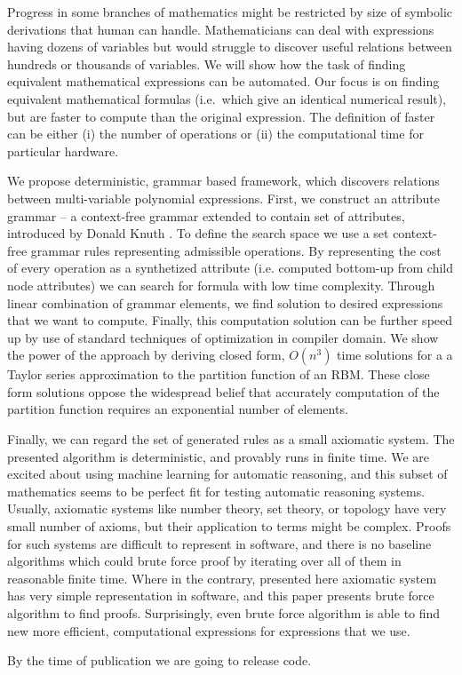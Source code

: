 Progress in some branches of
mathematics might be restricted by size of symbolic derivations that human can
handle.  Mathematicians can deal with expressions having dozens of
variables but would struggle to discover useful relations between hundreds or
thousands of variables. We will show how the task of finding equivalent
mathematical expressions can be automated. Our focus is on finding equivalent
mathematical formulas (i.e.~which give an identical numerical result),
but are faster to compute than the original expression. The definition
of faster can be either (i) the number of operations or (ii) the computational time
for particular hardware.

We propose deterministic, grammar based framework, which discovers relations between
multi-variable polynomial expressions. First, we construct an attribute grammar
-- a context-free grammar extended to contain set of attributes, introduced by
Donald Knuth \cite{knuth1968semantics}. To define the search space we use a set
context-free grammar rules representing admissible operations. By representing
the cost of every operation as a synthetized attribute (i.e. computed bottom-up from child node attributes)
we can search for formula with low time complexity.
Through linear combination of grammar elements, we find solution to desired 
expressions that we want to compute. Finally, this computation solution can be further speed up by use of standard
techniques of optimization in compiler domain. We show the power of the
approach by deriving closed form, $O(n^3)$ time solutions for a 
a Taylor series approximation to the partition
function of an RBM. These close form solutions oppose
the widespread belief that accurately computation of the partition function requires
an exponential number of elements.


Finally, we can regard the set of generated rules as a small axiomatic system.
The presented algorithm is deterministic, and provably runs in finite
time. We are excited about using machine learning for automatic reasoning, and
this subset of mathematics seems to be perfect fit for testing automatic reasoning systems.
Usually, axiomatic systems like number theory, set theory, or topology have very small
number of axioms, but their application to terms might be complex. Proofs
for such systems are difficult to represent in software, and there is no
baseline algorithms which could brute force proof by iterating over all of them in reasonable finite time.
Where in the contrary, presented here axiomatic system has very simple representation
in software, and this paper presents brute force algorithm to find proofs. 
Surprisingly, even brute force algorithm is able to find new more efficient,
computational expressions for expressions that we use.

By the time of publication we are going to release code.



